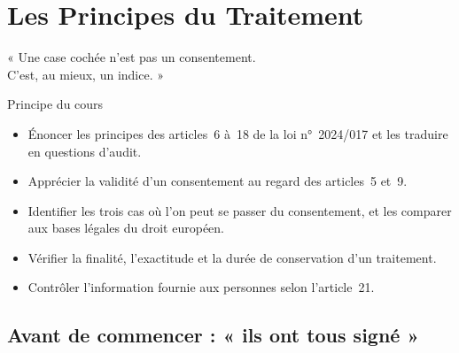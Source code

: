 
\chapter{Les Principes du Traitement}
\label{chap:principes}

\epigraph{%
    « Une case cochée n'est pas un consentement.\\
    C'est, au mieux, un indice. »%
}{Principe du cours}


\begin{boxobjectifs}
\begin{itemize}
    \item Énoncer les principes des articles~6 à~18 de la loi n°~2024/017
          et les traduire en questions d'audit.
    \item Apprécier la validité d'un consentement au regard des
          articles~5 et~9.
    \item Identifier les trois cas où l'on peut se passer du consentement,
          et les comparer aux bases légales du droit européen.
    \item Vérifier la finalité, l'exactitude et la durée de conservation
          d'un traitement.
    \item Contrôler l'information fournie aux personnes selon
          l'article~21.
\end{itemize}
\end{boxobjectifs}

\bigskip

\section*{Avant de commencer : « ils ont tous signé »}

